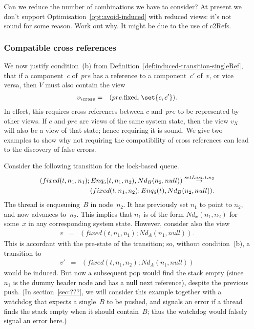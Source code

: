 \begin{improve}
Can we reduce the number of combinations we have to consider?
At present we don't support Optimisation~\ref{opt:avoid-induced} with reduced
views: it's not sound for some reason.  Work out why.  It might be due to the
use of c2Refs.
\end{improve}



\subsubsection{Compatible cross references}
\label{ssec:cross-refs}

We now justify condition~(b) from
Definition~\ref{def:induced-transition-singleRef}, that if a component~$c$
of~$pre$ has a reference to a component~$c'$ of~$v$, or vice versa, then $V$
must also contain the view
\begin{eqnarray*}
v_\cross & = & (pre.\fixed, \set{c, c'}).
\end{eqnarray*} 
In effect, this requires cross references between $c$ and~$pre$ to be
represented by other views.  If $c$ and $pre$ are views of the same system
state, then the view $v_X$ will also be a view of that state; hence requiring
it is sound.
%
We give two examples to show why not requiring the compatibility of cross
references can lead to the discovery of false errors. 

Consider the following transition for the lock-based queue.
\[
\begin{align}
(fixed(t, n_1, n_1); Enq_5(t, n_1, n_2), Nd_B(n_2, null)) 
  \stackrel{setLast.t.n_2}\rightarrow \\
\qquad (fixed(t, n_1, n_2); Enq_6(t), Nd_B(n_2, null)).
\end{align}
\]
The thread is enqueueing~$B$ in node~$n_2$.  It has previously set $n_1$ to
point to $n_2$, and now advances  to~$n_2$.  This implies that
$n_1$ is of the form $Nd_x(n_1, n_2)$ for some~$x$ in any corresponding system
state.  However, consider also the view
%
\begin{eqnarray*}
v & = & (fixed(t, n_1, n_1) ; Nd_A(n_1, null)).
\end{eqnarray*}
This is accordant with the pre-state of the transition; so, without
condition~(b), a transition to
\begin{eqnarray*}
v' & = & (fixed(t, n_1, n_2) ; Nd_A(n_1, null))
\end{eqnarray*}
would be induced.  But now a subsequent pop would find the stack empty (since
$n_1$ is the dummy header node and has a null next reference), despite the
previous push.  (In section~\ref{sec:???}, we will consider this example
together with a watchdog that expects a single~$B$ to be pushed, and signals
an error if a thread finds the stack empty when it should contain~$B$; thus
the watchdog would falsely signal an error here.)

